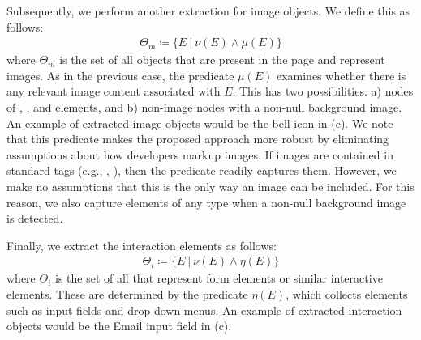 Subsequently, we perform another extraction for image objects.
We define this as follows:
\begin{align}
    \Theta_{m} \coloneqq \{ E \:\vert\: \nu(E) \land \mu(E) \}
\end{align}
where $\Theta_{m}$ is the set of all objects that are present in the page and represent images.
As in the previous case,
the predicate $\mu(E)$ examines whether
there is any relevant image content associated with $E$.
This has two possibilities:
a) nodes of , , and  elements, 
and b) non-image nodes with a non-null background image.
An example of extracted image objects would be the bell icon in 
(c).
We note that this predicate makes the proposed approach more robust
by eliminating assumptions about how developers markup images. 
If images are contained in standard tags (e.g., , ),
then the predicate readily captures them. 
However, we make no assumptions that this is the only way an image can be included.
For this reason, we also capture elements of any type when a non-null background image 
is detected.

Finally, we extract the interaction elements as follows:
\begin{align}
    \Theta_{i} \coloneqq \{ E \:\vert\: \nu(E) \land \eta(E) \}
\end{align}
where $\Theta_{i}$ is the set of all {\vizobjs} that represent form elements 
or similar interactive elements.
These are determined by the predicate $\eta(E)$, which collects
elements such as input fields and drop down menus.
An example of extracted interaction objects would be the Email 
input field in (c).


